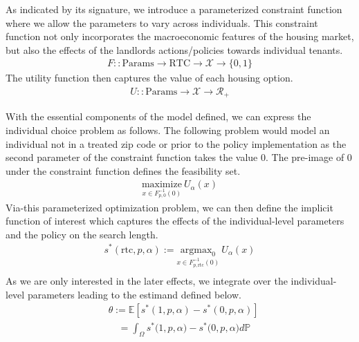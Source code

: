 \documentclass[a4paper,12pt]{article}
\begin{document}
As indicated by its signature, we introduce a parameterized constraint function where we allow the parameters to vary across individuals. This constraint function not only incorporates the macroeconomic features of the housing market, but also the effects of the landlords actions/policies towards individual tenants.
\begin{align*}
   F :: \textrm{Params} \to  \textrm{RTC} \to \mathcal{X} \to \{0, 1\} %
\end{align*}
The utility function then captures the value of each housing option. 
\begin{align*}
U :: \textrm{Params} \to \mathcal{X} \to \mathcal{R}_+ 
\end{align*}


%
With the essential components of the model defined, we can express the individual choice problem as follows. The following problem would model an individual not in a treated zip code or prior to the policy implementation as the second parameter of the constraint function takes the value $0$. The pre-image of $0$ under the constraint function defines the feasibility set. 
\begin{align*}
\underset{x \in F_{p, 0}^{-1}(0)}{\textrm{maximize}} \ U_{\alpha} (x)
\end{align*}
Via-this parameterized optimization problem, we can then define the implicit function of interest which captures the effects of the individual-level parameters and the policy on the search length. 
\begin{align*}
s^*(\textrm{rtc}, p, \alpha) := \underset{x \in F_{p, \textrm{rtc}}^{-1}(0)}{\textrm{argmax}_0} \ U_{\alpha} (x) \\ 
\end{align*}
As we are only interested in the later effects, we integrate over the individual-level parameters leading to the estimand defined below.
\begin{align*}
&\theta := \mathbb{E}[s^*(1, p, \alpha) - s^*(0,  p, \alpha)] \\
&\quad = \int _{\Omega} s^*\big(1, p, \alpha\big) - s^*\big(0, p, \alpha\big)d\mathbb{P}
\end{align*}
\end{document}
